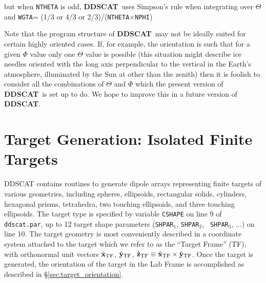 \noindent but when {\tt NTHETA} is odd, {{\bf DDSCAT}}\ uses Simpson's
rule when integrating over $\Theta$ and \hfill\break \indent\indent
{\tt WGTA}= (1/3 or 4/3 or 2/3)/({\tt NTHETA}$\times${\tt NPHI})

Note that the program structure of {{\bf DDSCAT}}\ may not be ideally
suited for certain highly oriented cases.  If, for example, the
orientation is such that for a given $\Phi$ value only one $\Theta$
value is possible (this situation might describe ice needles oriented
with the long axis perpendicular to the vertical in the Earth's
atmosphere, illuminated by the Sun at other than the zenith) then it
is foolish to consider all the combinations of $\Theta$ and $\Phi$
which the present version of {{\bf DDSCAT}}\ is set up to do.  We hope
to improve this in a future version of {{\bf DDSCAT}}.

\section{Target Generation: Isolated Finite Targets
         \label{sec:target_generation}}
DDSCAT contains routines to generate dipole arrays representing finite
targets of various geometries, including spheres, ellipsoids,
rectangular solids, cylinders, hexagonal prisms, tetrahedra, two
touching ellipsoids, and three touching ellipsoids.  The target type
is specified by variable {\tt CSHAPE} on line 9 of {\tt ddscat.par},
up to 12 target shape parameters ({\tt SHPAR$_1$}, {\tt SHPAR$_2$}, {\tt
SHPAR}$_3$, ...) on line 10.
The target geometry is most conveniently described in a
coordinate system attached to the target which we refer to as the
``Target Frame'' (TF), with orthonormal 
unit vectors $\hat{\bf x}_{\rm TF}$, $\hat{\bf y}_{\rm TF}$, $\hat{\bf z}_{\rm TF}\equiv\hat{\bf x}_{\rm TF}\times\hat{\bf y}_{\rm TF}$.
Once the target is generated, the
orientation of the target in the Lab Frame is accomplished as
described in \S\ref{sec:target_orientation}.

